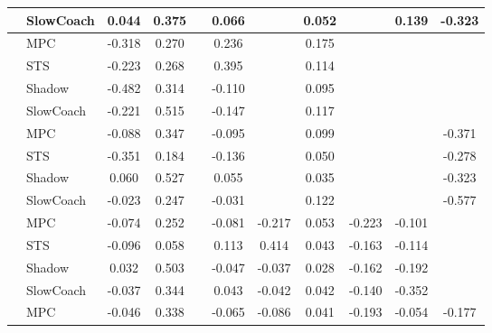 \begin{tabular}{|l|l|*{9}{c|}}
                                                           & SlowCoach &    0.044 &     0.375 &        &  0.066 &     &  0.052 &      &   0.139 &   -0.323 \\
\midrule
[True, True, False, True, False, True, False, False, False] & MPC &   -0.318 &     0.270 &        &  0.236 &     &  0.175 &      &      &       \\
                                                           & STS &   -0.223 &     0.268 &        &  0.395 &     &  0.114 &      &      &       \\
                                                           & Shadow &   -0.482 &     0.314 &        & -0.110 &     &  0.095 &      &      &       \\
                                                           & SlowCoach &   -0.221 &     0.515 &        & -0.147 &     &  0.117 &      &      &       \\
\midrule
[True, True, False, True, False, True, False, False, True] & MPC &   -0.088 &     0.347 &        & -0.095 &     &  0.099 &      &      &   -0.371 \\
                                                           & STS &   -0.351 &     0.184 &        & -0.136 &     &  0.050 &      &      &   -0.278 \\
                                                           & Shadow &    0.060 &     0.527 &        &  0.055 &     &  0.035 &      &      &   -0.323 \\
                                                           & SlowCoach &   -0.023 &     0.247 &        & -0.031 &     &  0.122 &      &      &   -0.577 \\
\midrule
[True, True, False, True, True, True, True, True, False] & MPC &   -0.074 &     0.252 &        & -0.081 & -0.217 &  0.053 &  -0.223 &  -0.101 &       \\
                                                           & STS &   -0.096 &     0.058 &        &  0.113 &  0.414 &  0.043 &  -0.163 &  -0.114 &       \\
                                                           & Shadow &    0.032 &     0.503 &        & -0.047 & -0.037 &  0.028 &  -0.162 &  -0.192 &       \\
                                                           & SlowCoach &   -0.037 &     0.344 &        &  0.043 & -0.042 &  0.042 &  -0.140 &  -0.352 &       \\
\midrule
[True, True, False, True, True, True, True, True, True] & MPC &   -0.046 &     0.338 &        & -0.065 & -0.086 &  0.041 &  -0.193 &  -0.054 &   -0.177 \\

\end{tabular}
